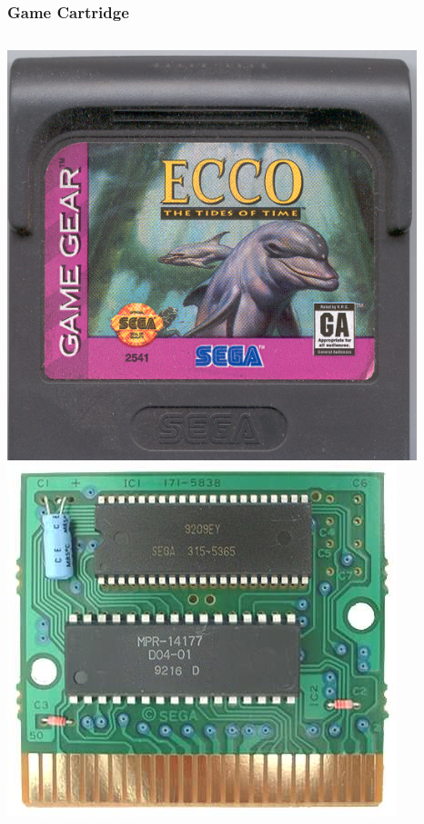 \documentclass{beamer}
\begin{document}
\begin{frame}
    \frametitle{Game Cartridge}

    \begin{columns}[c]
            \includegraphics[width=\textwidth]{../design/gg_cart.png}
            \includegraphics[width=\textwidth]{../design/gg_cart_pcb.png}
    \end{columns}
\end{frame}
\end{document}

